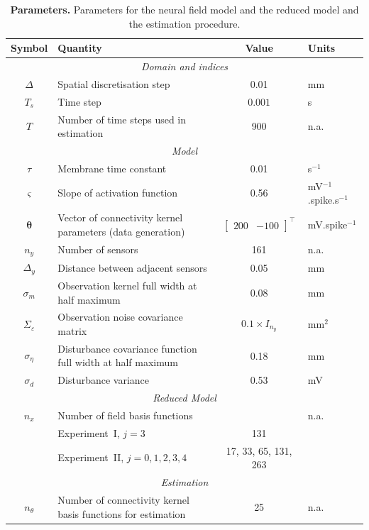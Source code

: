 \documentclass[review,authoryear,3p]{elsarticle}
\begin{document}
\begin{table}[!ht]
\begin{tabular}{|c|l|c|l|}
	\hline
	\textbf{Symbol} & \textbf{Quantity} & \textbf{Value} & \textbf{Units}\\
	\hline
	\multicolumn{4}{|c|}{\emph{Domain and indices}}\\
	\hline
	$\Delta$ & Spatial discretisation step & 0.01 & mm \\
	$T_s$ & Time step & $0.001$ & s\\
	$T$ & Number of time steps used in estimation & 900 & n.a.\\
	\hline 
\multicolumn{4}{|c|}{\emph{Model}}\\
	\hline
	$\tau$ & Membrane time constant & 0.01 & s$^{-1}$ \\
	$\varsigma$ & Slope of activation function & 0.56 \citep{Wendling2005} & mV$^{-1}$.spike.s$^{-1}$\\
	$\boldsymbol{\theta}$ & Vector of connectivity kernel parameters (data generation) & $\left[\begin{array}{cc}
	200 & -100
	\end{array}
	\right]^{\top}$ & mV.spike$^{-1}$\\
	$n_y$ & Number of sensors & 161 & n.a.\\ 
	$\Delta_y$ & Distance between adjacent sensors & 0.05 & mm\\
	$\sigma_{m}$ & Observation kernel full width at half maximum & 0.08 & mm \\
	$\Sigma_{\varepsilon}$ & Observation noise covariance matrix & $0.1 \times I_{n_y}$ & mm$^2$ \\
	$\sigma_{\eta}$& Disturbance covariance function full width at half maximum & 0.18 & mm\\
	$\sigma_{d}$ & Disturbance variance & 0.53 & mV \\
	\hline 
	\multicolumn{4}{|c|}{\emph{Reduced Model}}\\
	\hline
	$n_x$ & Number of field basis functions&& n.a.\\
	$   $ &Experiment~I, $j=3$&131&\\
	$   $ &Experiment~II, $j=0,1,2,3,4$&17, 33, 65, 131, 263&\\ 
	\hline 
	\multicolumn{4}{|c|}{\emph{Estimation}}\\ 
	\hline
	$n_{\theta}$&Number of connectivity kernel basis functions for estimation&25&n.a.\\
	\hline 
\end{tabular}
\caption{\textbf{Parameters.} Parameters for the neural field model and the reduced model and the estimation procedure.}
\label{tab:Parameters}
\end{table}   
\newpage
\clearpage
\end{document}

